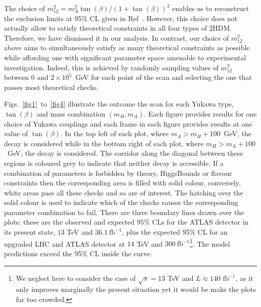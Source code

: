 The choice of \(m^2_{12} = m_A^2 \tan(\beta) / (1 + \tan(\beta))^2\) enables us to reconstruct the exclusion limits at 95\%  CL given in Ref~\cite{Aaboud:2018eoy}.
However, this choice does not actually allow to satisfy theoretical constraints in all four types of 2HDM.
Therefore, we have dismissed it in our analysis.
In contrast, our choice of \(m_{12}^2\) above aims to simultaneously satisfy as many theoretical constraints as possible while affording one with significant parameter space amenable to experimental investigation.
Indeed, this is achieved by randomly sampling values of \(m^2_{12}\) between \(0\) and \(2\times 10^{5}\)~GeV for each point of the scan and selecting the one that passes most theoretical checks.



Figs.~\ref{fig1}~to~\ref{fig4} illustrate the outcome the scan for each
Yukawa type, \(\tan(\beta)\) and mass combination $(m_H,m_A)$.
Each figure provides results for one choice of Yukawa couplings
and each frame in each figure provides results at one value of \(\tan(\beta)\).
In the top left of each plot, where \(m_A > m_H+100\)~GeV, the decay \AZH{} is considered while 
in the bottom right of each plot, where \(m_H > m_A+100\)~GeV,   the decay \HZA{} is considered.
The corridor along the diagonal between these regions is coloured grey to indicate that neither decay is accessible.
%
If a combination of parameters is forbidden by theory, HiggsBounds or flavour constraints
then the corresponding area is filled with solid colour, conversely,
white areas pass all these checks and so are of interest. The hatching over the solid colour is used to indicate which of the checks
causes the corresponding parameter combination to fail.
There are three boundary lines drawn over the plots: 
these are the observed and expected \(95\%\) CLs for the ATLAS detector in its present state, \(13\) TeV and \(36.1~\text{fb}^{-1}\),
plus the expected 95\% CL for an upgraded LHC and ATLAS detector at \(14\) TeV and \(300~\text{fb}^{-1}\)\footnote{We neglect here to consider the case of $\sqrt s=13$ TeV and $L\approx140$ fb$^{-1}$, as it only improves marginally the present situation yet it would be make the plots far too crowded.}.
The model predictions exceed the 95\% CL inside the curve.

